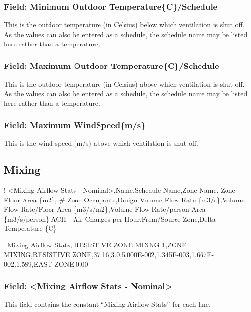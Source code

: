 \subsubsection{Field: Minimum Outdoor Temperature\{C\}/Schedule}\label{field-minimum-outdoor-temperaturecschedule}

This is the outdoor temperature (in Celsius) below which ventilation is shut off. As the values can also be entered as a schedule, the schedule name may be listed here rather than a temperature.

\subsubsection{Field: Maximum Outdoor Temperature\{C\}/Schedule}\label{field-maximum-outdoor-temperaturecschedule}

This is the outdoor temperature (in Celsius) above which ventilation is shut off. As the values can also be entered as a schedule, the schedule name may be listed here rather than a temperature.

\subsubsection{Field: Maximum WindSpeed\{m/s\}}\label{field-maximum-windspeedms}

This is the wind speed (m/s) above which ventilation is shut off.

\subsection{Mixing}\label{mixing}

! \textless{}Mixing Airflow Stats - Nominal\textgreater{},Name,Schedule Name,Zone Name, Zone Floor Area \{m2\}, \# Zone Occupants,Design Volume Flow Rate \{m3/s\},Volume Flow Rate/Floor Area \{m3/s/m2\},Volume Flow Rate/person Area \{m3/s/person\},ACH - Air Changes per Hour,From/Source Zone,Delta Temperature \{C\}

~Mixing Airflow Stats, RESISTIVE ZONE MIXNG 1,ZONE MIXING,RESISTIVE ZONE,37.16,3.0,5.000E-002,1.345E-003,1.667E-002,1.589,EAST ZONE,0.00

\subsubsection{Field: \textless{}Mixing Airflow Stats - Nominal\textgreater{}}\label{field-mixing-airflow-stats---nominal}

This field contains the constant ``Mixing Airflow Stats'' for each line.

